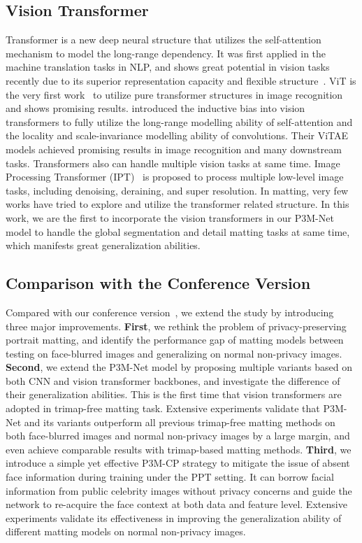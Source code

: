 \documentclass[twocolumn]{svjour3}
\begin{document}
\subsection{Vision Transformer}
Transformer is a new deep neural structure that utilizes the self-attention mechanism to model the long-range dependency. It was first applied in the machine translation tasks in NLP, and shows great potential in vision tasks recently due to its superior representation capacity and flexible structure~\citep{dosovitskiy2020image,swin,vitae,zhang2022vitaev2}. ViT is the very first work~\citep{dosovitskiy2020image} to utilize pure transformer structures in image recognition and shows promising results. \citep{vitae} introduced the inductive bias into vision transformers to fully utilize the long-range modelling ability of self-attention and the locality and scale-invariance modelling ability of convolutions. Their ViTAE models achieved promising results in image recognition and many downstream tasks. Transformers also can handle multiple vision tasks at same time. Image Processing Transformer (IPT)~\citep{IPT} is proposed to process multiple low-level image tasks, including denoising, deraining, and super resolution. In matting, very few works have tried to explore and utilize the transformer related structure. In this work, we are the first to incorporate the vision transformers in our P3M-Net model to handle the global segmentation and detail matting tasks at same time, which manifests great generalization abilities.


\subsection{Comparison with the Conference Version}
Compared with our conference version~\citep{p3m_mm}, we extend the study by introducing three major improvements.
\textbf{First}, we rethink the problem of privacy-preserving portrait matting, and identify the performance gap of matting models between testing on face-blurred images and generalizing on normal non-privacy images. 
\textbf{Second}, we extend the P3M-Net model by proposing multiple variants based on both CNN and vision transformer backbones, and investigate the difference of their generalization abilities. This is the first time that vision transformers are adopted in trimap-free matting task. Extensive experiments validate that P3M-Net and its variants outperform all previous trimap-free matting methods on both face-blurred images and normal non-privacy images by a large margin, and even achieve comparable results with trimap-based matting methods.
\textbf{Third}, we introduce a simple yet effective P3M-CP strategy to mitigate the issue of absent face information during training under the PPT setting. It can borrow facial information from public celebrity images without privacy concerns and guide the network to re-acquire the face context at both data and feature level. Extensive experiments validate its effectiveness in improving the generalization ability of different matting models on normal non-privacy images.
\end{document}
